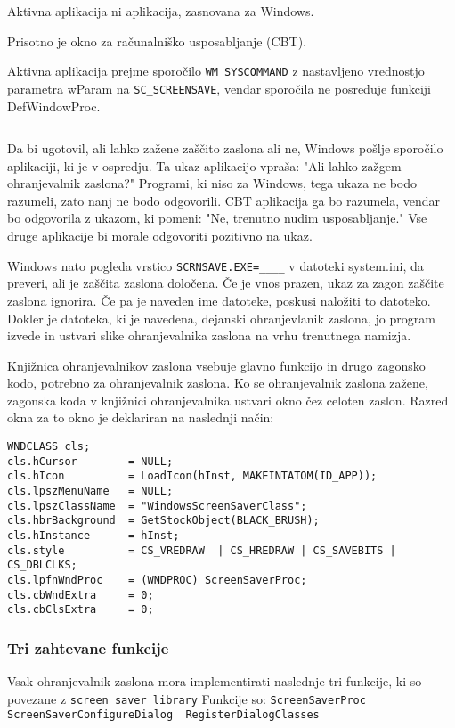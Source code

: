 \documentclass[11pt, oneside]{article}   	%
\begin{document}
\begin{description}[font=$\bullet$~\normalfont\scshape\color{red!50!black}]
\item Aktivna aplikacija ni aplikacija, zasnovana za Windows.
\item Prisotno je okno za računalniško usposabljanje (CBT).
\item Aktivna aplikacija prejme sporočilo \Verb#WM_SYSCOMMAND# z nastavljeno vrednostjo parametra wParam na \Verb#SC_SCREENSAVE#, vendar sporočila ne posreduje funkciji DefWindowProc.
\end{description}
\begin{verbatim}  \end{verbatim}
Da bi ugotovil, ali lahko zažene zaščito zaslona ali ne, Windows pošlje sporočilo aplikaciji, ki je v ospredju. Ta ukaz aplikacijo vpraša: "Ali lahko zažgem ohranjevalnik zaslona?" Programi, ki niso za Windows, tega ukaza ne bodo razumeli, zato nanj ne bodo odgovorili. CBT aplikacija ga bo razumela, vendar bo odgovorila z ukazom, ki pomeni: "Ne, trenutno nudim usposabljanje." Vse druge aplikacije bi morale odgovoriti pozitivno na ukaz.

Windows nato pogleda vrstico \Verb#SCRNSAVE.EXE=____# v datoteki system.ini, da preveri, ali je zaščita zaslona določena. Če je vnos prazen, ukaz za zagon zaščite zaslona ignorira. Če pa je naveden ime datoteke, poskusi naložiti to datoteko. Dokler je datoteka, ki je navedena, dejanski ohranjevlanik zaslona, jo program izvede in ustvari slike ohranjevalnika zaslona na vrhu trenutnega namizja.

Knjižnica ohranjevalnikov zaslona vsebuje glavno funkcijo in drugo zagonsko kodo, potrebno za ohranjevalnik zaslona. Ko se ohranjevalnik zaslona zažene, zagonska koda v knjižnici ohranjevalnika ustvari okno čez celoten zaslon. Razred okna za to okno je deklariran na naslednji način:
\begin{verbatim}
WNDCLASS cls; 
cls.hCursor        = NULL; 
cls.hIcon          = LoadIcon(hInst, MAKEINTATOM(ID_APP)); 
cls.lpszMenuName   = NULL; 
cls.lpszClassName  = "WindowsScreenSaverClass"; 
cls.hbrBackground  = GetStockObject(BLACK_BRUSH); 
cls.hInstance      = hInst; 
cls.style          = CS_VREDRAW  | CS_HREDRAW | CS_SAVEBITS | CS_DBLCLKS; 
cls.lpfnWndProc    = (WNDPROC) ScreenSaverProc; 
cls.cbWndExtra     = 0; 
cls.cbClsExtra     = 0;
\end{verbatim}

\subsubsection{Tri zahtevane funkcije}
Vsak ohranjevalnik zaslona mora implementirati naslednje tri funkcije,  ki so povezane z \Verb#screen saver library# \newline
Funkcije so: \Verb#ScreenSaverProc ScreenSaverConfigureDialog  RegisterDialogClasses#
\end{document}
